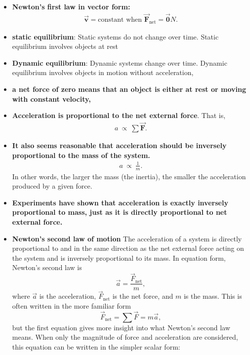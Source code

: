 \documentclass{report}
\begin{document}
\begin{itemize}
            \item \textbf{Newton’s first law in vector form:}
                \begin{align*}
                    \vec{\mathbf{v}} = \text{constant when } \vec{\mathbf{F}}_{\text{net}} = \vec{\mathbf{0}}N
                .\end{align*}
            \item \textbf{static equilibrium}: Static systems do not change over time. Static equilibrium involves objects at rest
            \item \textbf{Dynamic equilibrium}: Dynamic systems change over time. Dynamic equilibrium involves objects in motion without acceleration,
            \item \textbf{a net force of zero means that an object is either at rest or moving with constant velocity,}
            \item \textbf{Acceleration is proportional to the net external force}. That is,
                \begin{align*}
                    a\ \propto\ \sum \vec{\mathbf{F}}
                .\end{align*}
            \item \textbf{It also seems reasonable that acceleration should be inversely proportional to the mass of the system.}
                \begin{align*}
                    a\ \propto\ \frac{1}{m}
                .\end{align*}
                In other words, the larger the mass (the inertia), the smaller the acceleration produced by a given force.
            \item \textbf{Experiments have shown that acceleration is exactly inversely proportional to mass, just as it is directly proportional to net external force.}
            \item \textbf{Newton's second law of motion}
                The acceleration of a system is directly proportional to and in the same direction as the net external force acting on the system and is inversely proportional to its mass. In equation form, Newton's second law is
                \[
                    \vec{a} = \frac{\vec{F}_{\text{net}}}{m},
                \]
                where $\vec{a}$ is the acceleration, $\vec{F}_{\text{net}}$ is the net force, and $m$ is the mass. This is often written in the more familiar form
                \[
                    \vec{F}_{\text{net}} = \sum \vec{F} = m\vec{a},
                \]
                but the first equation gives more insight into what Newton's second law means. When only the magnitude of force and acceleration are considered, this equation can be written in the simpler scalar form:

\end{itemize}
\end{document}

